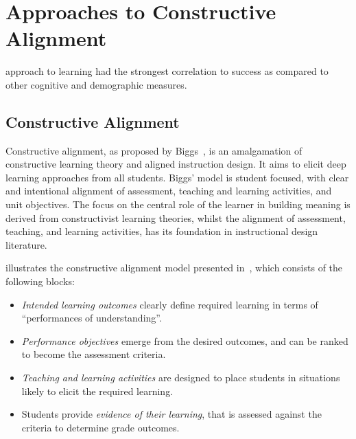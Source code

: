
\chapter{Approaches to Constructive Alignment} %
\label{cha:background}

\cite{DeRaadt:2005} approach to learning  had the strongest correlation to success as compared to other cognitive and demographic measures.

\section{Constructive Alignment} %
\label{sec:constructive_alignment}

Constructive alignment, as proposed by Biggs~\cite{Biggs:1996c}, is an amalgamation of constructive learning theory and aligned instruction design. It aims to elicit deep learning approaches from all students. Biggs' model is student focused, with clear and intentional alignment of assessment, teaching and learning activities, and unit objectives. The focus on the central role of the learner in building meaning is derived from constructivist learning theories, whilst the alignment of assessment, teaching, and learning activities, has its foundation in instructional design literature. 

 illustrates the constructive alignment model presented in~\cite{Houghton:2004}, which consists of the following blocks:

\begin{itemize}
	\item \emph{Intended learning outcomes} clearly define required learning in terms of ``performances of understanding''.
	\item \emph{Performance objectives} emerge from the desired outcomes, and can be ranked to become the assessment criteria.
	\item \emph{Teaching and learning activities} are designed to place students in situations likely to elicit the required learning.
	\item Students provide \emph{evidence of their learning}, that is assessed against the criteria to determine grade outcomes.
\end{itemize}



